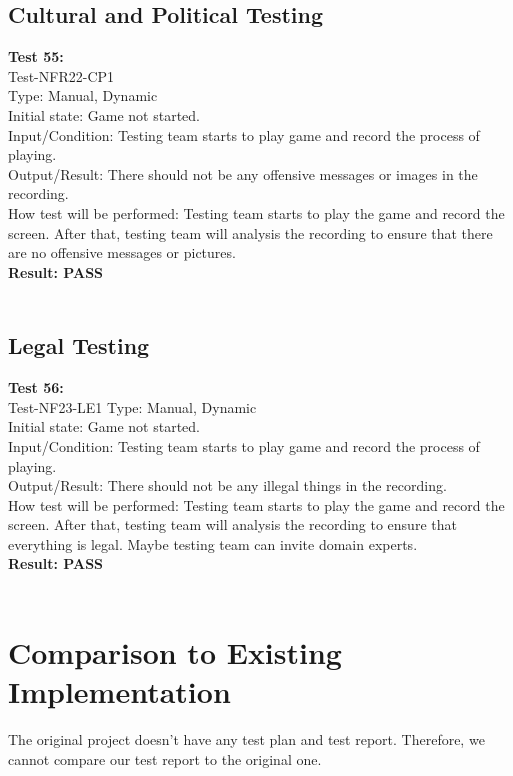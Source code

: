 \documentclass[12pt, titlepage]{article}
\begin{document}
\subsection{Cultural and Political Testing}
\textbf{Test 55:}\\
Test-NFR22-CP1\\
Type: Manual, Dynamic\\
Initial state: Game not started.\\
Input/Condition: Testing team starts to play game
and record the process of playing.\\
Output/Result: There should not be any offensive
messages or images in the recording.\\
How test will be performed: Testing team starts to
play the game and record the screen. After that, 
testing team will analysis the recording to ensure
that there are no offensive messages or pictures.\\
\textbf{Result: PASS}\\\\

\subsection{Legal Testing}
\textbf{Test 56:}\\
Test-NF23-LE1
Type: Manual, Dynamic\\
Initial state: Game not started.\\
Input/Condition: Testing team starts to play game
and record the process of playing.\\
Output/Result: There should not be any illegal things in the recording.\\
How test will be performed: Testing team starts to
play the game and record the screen. After that, 
testing team will analysis the recording to ensure
that everything is legal. Maybe testing team can
invite domain experts.\\
\textbf{Result: PASS}\\\\





	
\section{Comparison to Existing Implementation}	

The original project doesn't have any test plan and test report. Therefore, we cannot compare our test report to the original one.
\end{document}
